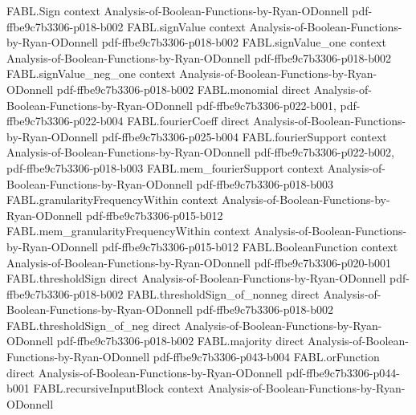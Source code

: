 \begin{theorem}
\label{FABL.orFunction_unanimous}
\leanok
{}
\proofstep
  {FABL.Sign}
  {context}
  {Analysis-of-Boolean-Functions-by-Ryan-ODonnell}
  {pdf-ffbe9c7b3306-p018-b002}
\proofstep
  {FABL.signValue}
  {context}
  {Analysis-of-Boolean-Functions-by-Ryan-ODonnell}
  {pdf-ffbe9c7b3306-p018-b002}
\proofstep
  {FABL.signValue_one}
  {context}
  {Analysis-of-Boolean-Functions-by-Ryan-ODonnell}
  {pdf-ffbe9c7b3306-p018-b002}
\proofstep
  {FABL.signValue_neg_one}
  {context}
  {Analysis-of-Boolean-Functions-by-Ryan-ODonnell}
  {pdf-ffbe9c7b3306-p018-b002}
\proofstep
  {FABL.monomial}
  {direct}
  {Analysis-of-Boolean-Functions-by-Ryan-ODonnell}
  {pdf-ffbe9c7b3306-p022-b001,
    pdf-ffbe9c7b3306-p022-b004}
\proofstep
  {FABL.fourierCoeff}
  {direct}
  {Analysis-of-Boolean-Functions-by-Ryan-ODonnell}
  {pdf-ffbe9c7b3306-p025-b004}
\proofstep
  {FABL.fourierSupport}
  {context}
  {Analysis-of-Boolean-Functions-by-Ryan-ODonnell}
  {pdf-ffbe9c7b3306-p022-b002,
    pdf-ffbe9c7b3306-p018-b003}
\proofstep
  {FABL.mem_fourierSupport}
  {context}
  {Analysis-of-Boolean-Functions-by-Ryan-ODonnell}
  {pdf-ffbe9c7b3306-p018-b003}
\proofstep
  {FABL.granularityFrequencyWithin}
  {context}
  {Analysis-of-Boolean-Functions-by-Ryan-ODonnell}
  {pdf-ffbe9c7b3306-p015-b012}
\proofstep
  {FABL.mem_granularityFrequencyWithin}
  {context}
  {Analysis-of-Boolean-Functions-by-Ryan-ODonnell}
  {pdf-ffbe9c7b3306-p015-b012}
\proofstep
  {FABL.BooleanFunction}
  {context}
  {Analysis-of-Boolean-Functions-by-Ryan-ODonnell}
  {pdf-ffbe9c7b3306-p020-b001}
\proofstep
  {FABL.thresholdSign}
  {direct}
  {Analysis-of-Boolean-Functions-by-Ryan-ODonnell}
  {pdf-ffbe9c7b3306-p018-b002}
\proofstep
  {FABL.thresholdSign_of_nonneg}
  {direct}
  {Analysis-of-Boolean-Functions-by-Ryan-ODonnell}
  {pdf-ffbe9c7b3306-p018-b002}
\proofstep
  {FABL.thresholdSign_of_neg}
  {direct}
  {Analysis-of-Boolean-Functions-by-Ryan-ODonnell}
  {pdf-ffbe9c7b3306-p018-b002}
\proofstep
  {FABL.majority}
  {direct}
  {Analysis-of-Boolean-Functions-by-Ryan-ODonnell}
  {pdf-ffbe9c7b3306-p043-b004}
\proofstep
  {FABL.orFunction}
  {direct}
  {Analysis-of-Boolean-Functions-by-Ryan-ODonnell}
  {pdf-ffbe9c7b3306-p044-b001}
\proofstep
  {FABL.recursiveInputBlock}
  {context}
  {Analysis-of-Boolean-Functions-by-Ryan-ODonnell}

\end{theorem}
